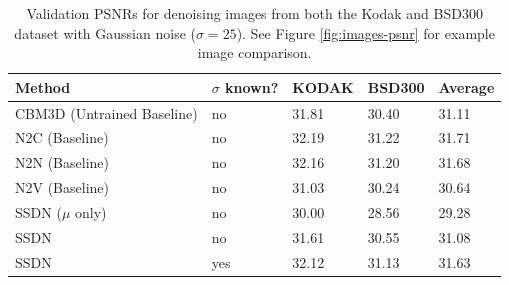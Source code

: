 \documentclass{article} %
\begin{document}
\begin{table}[H]
\captionsetup{justification=centering}
\caption{Validation PSNRs for denoising images from both the Kodak and BSD300 dataset with Gaussian noise  ($\sigma = 25$). See Figure \ref{fig:images-psnr} for example image comparison.}
\label{tab:eval_psnrs}
\begin{center}
\begin{tabular}{lllll}
\toprule
Method & $\sigma$ known? & KODAK & BSD300 & Average \\
\midrule
CBM3D (Untrained Baseline) & no  & 31.81 & 30.40 & 31.11 \\
N2C (Baseline)             & no  & 32.19 & 31.22 & 31.71 \\
N2N (Baseline)             & no  & 32.16 & 31.20 & 31.68 \\
N2V (Baseline)             & no  & 31.03 & 30.24 & 30.64 \\
SSDN ($\mu$ only)          & no  & 30.00 & 28.56 & 29.28 \\
SSDN                       & no  & 31.61 & 30.55 & 31.08 \\
SSDN                       & yes & 32.12 & 31.13 & 31.63 \\
\bottomrule
\end{tabular}
\end{center}
\end{table}
\vspace{-5mm}
\end{document}
